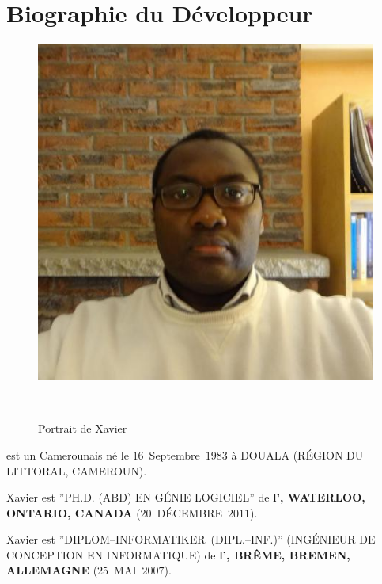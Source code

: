 \vspace{-1.1em}
\section{Biographie du D\'eveloppeur}\label{chap:biography}
\vspace{-0.9em}
\begin{figure}[!htpb]
\centering
\includegraphics[scale=0.35]{../images/XavierNOUNDOU-2}
\caption{Portrait de Xavier}~\label{fig:xaviernoumbis}
\end{figure}

\textbf{\myfullacademicname} est un Camerounais
n\'e le $16$~Septembre~$1983$ \`a DOUALA (R\'EGION DU LITTORAL, CAMEROUN).

Xavier est ''PH.D. (ABD) EN G\'ENIE LOGICIEL'' de
\textbf{l'\uwaterloo, WATERLOO, ONTARIO, CANADA}
($20$~D\'ECEMBRE~$2011$).

Xavier est ''DIPLOM--INFORMATIKER~(DIPL.--INF.)''
(ING\'ENIEUR DE CONCEPTION EN INFORMATIQUE) de
\textbf{l'\bremenu, BR\^EME, BREMEN, ALLEMAGNE}
($25$~MAI~$2007$).